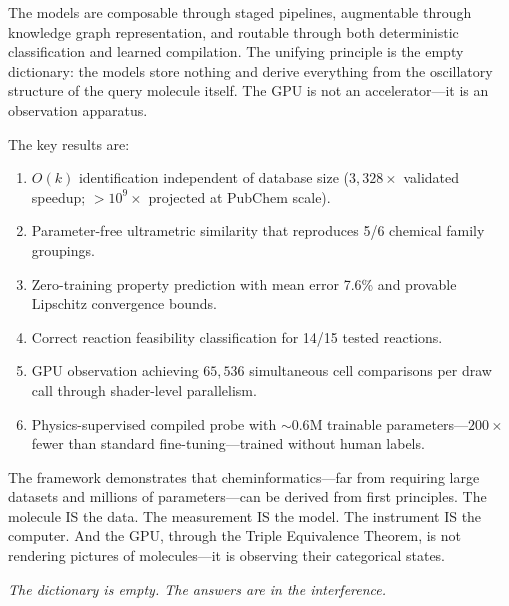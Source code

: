 \documentclass[11pt,twocolumn,a4paper]{article}
\theoremstyle{definition}
\theoremstyle{remark}
\begin{document}
The models are composable through staged pipelines, augmentable through knowledge graph representation, and routable through both deterministic classification and learned compilation. The unifying principle is the empty dictionary: the models store nothing and derive everything from the oscillatory structure of the query molecule itself. The GPU is not an accelerator---it is an observation apparatus.

The key results are:
\begin{enumerate}[nosep]
\item $O(k)$ identification independent of database size ($3{,}328\times$ validated speedup; $>10^9\times$ projected at PubChem scale).
\item Parameter-free ultrametric similarity that reproduces 5/6 chemical family groupings.
\item Zero-training property prediction with mean error 7.6\% and provable Lipschitz convergence bounds.
\item Correct reaction feasibility classification for 14/15 tested reactions.
\item GPU observation achieving $65{,}536$ simultaneous cell comparisons per draw call through shader-level parallelism.
\item Physics-supervised compiled probe with $\sim 0.6$M trainable parameters---$200\times$ fewer than standard fine-tuning---trained without human labels.
\end{enumerate}

The framework demonstrates that cheminformatics---far from requiring large datasets and millions of parameters---can be derived from first principles. The molecule IS the data. The measurement IS the model. The instrument IS the computer. And the GPU, through the Triple Equivalence Theorem, is not rendering pictures of molecules---it is observing their categorical states.

\medskip
\noindent\textit{The dictionary is empty. The answers are in the interference.}



\end{document}

